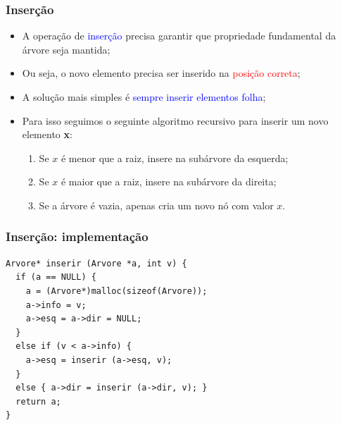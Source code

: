 \documentclass{beamer}
\newcommand{\tcb}[1]{\textcolor{blue}{#1}}
\newcommand{\tcr}[1]{\textcolor{red}{#1}}
\begin{document}
\begin{frame}[fragile]
  \frametitle{Inserção}

  \begin{itemize}
    \item A operação de \tcb{inserção} precisa garantir que propriedade fundamental da árvore seja mantida;
    \item Ou seja, o novo elemento precisa ser inserido na \tcr{posição correta}; 
    \item A solução mais simples é \tcb{sempre inserir elementos folha};
    \item Para isso seguimos o seguinte algoritmo recursivo para inserir um novo elemento \textbf{x}:
    \begin{enumerate}
      \item Se $x$ é menor que a raiz, insere na subárvore da esquerda;
      \item Se $x$ é maior que a raiz, insere na subárvore da direita;
      \item Se a árvore é vazia, apenas cria um novo nó com valor $x$.
    \end{enumerate}

  \end{itemize}
\end{frame}

\begin{frame}[fragile]
  \frametitle{Inserção: implementação}
  
  \begin{verbatim}
Arvore* inserir (Arvore *a, int v) {
  if (a == NULL) {
    a = (Arvore*)malloc(sizeof(Arvore));
    a->info = v;
    a->esq = a->dir = NULL;
  }
  else if (v < a->info) {
    a->esq = inserir (a->esq, v);
  }
  else { a->dir = inserir (a->dir, v); }
  return a;
}
  \end{verbatim}

\end{frame}
\end{document}
